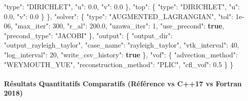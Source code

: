 \documentclass[
  10pt,
]{article}
\newenvironment{Shaded}{}{}
\newcommand{\DataTypeTok}[1]{\textcolor[rgb]{0.56,0.13,0.00}{#1}}
\newcommand{\DecValTok}[1]{\textcolor[rgb]{0.25,0.63,0.44}{#1}}
\newcommand{\FloatTok}[1]{\textcolor[rgb]{0.25,0.63,0.44}{#1}}
\newcommand{\FunctionTok}[1]{\textcolor[rgb]{0.02,0.16,0.49}{#1}}
\newcommand{\KeywordTok}[1]{\textcolor[rgb]{0.00,0.44,0.13}{\textbf{#1}}}
\newcommand{\StringTok}[1]{\textcolor[rgb]{0.25,0.44,0.63}{#1}}
\begin{document}
\begin{Shaded}
\begin{Highlighting}[]
      \DataTypeTok{"type"}\FunctionTok{:} \StringTok{"DIRICHLET"}\FunctionTok{,}
      \DataTypeTok{"u"}\FunctionTok{:} \FloatTok{0.0}\FunctionTok{,}
      \DataTypeTok{"v"}\FunctionTok{:} \FloatTok{0.0}
    \FunctionTok{\},}
    \DataTypeTok{"top"}\FunctionTok{:} \FunctionTok{\{}
      \DataTypeTok{"type"}\FunctionTok{:} \StringTok{"DIRICHLET"}\FunctionTok{,}
      \DataTypeTok{"u"}\FunctionTok{:} \FloatTok{0.0}\FunctionTok{,}
      \DataTypeTok{"v"}\FunctionTok{:} \FloatTok{0.0}
    \FunctionTok{\}}
  \FunctionTok{\},}
  \DataTypeTok{"solver"}\FunctionTok{:} \FunctionTok{\{}
    \DataTypeTok{"type"}\FunctionTok{:} \StringTok{"AUGMENTED\_LAGRANGIAN"}\FunctionTok{,}
    \DataTypeTok{"tol"}\FunctionTok{:} \DecValTok{1e{-}06}\FunctionTok{,}
    \DataTypeTok{"max\_iter"}\FunctionTok{:} \DecValTok{300}\FunctionTok{,}
    \DataTypeTok{"r\_al"}\FunctionTok{:} \FloatTok{200.0}\FunctionTok{,}
    \DataTypeTok{"uzawa\_iter"}\FunctionTok{:} \DecValTok{1}\FunctionTok{,}
    \DataTypeTok{"use\_precond"}\FunctionTok{:} \KeywordTok{true}\FunctionTok{,}
    \DataTypeTok{"precond\_type"}\FunctionTok{:} \StringTok{"JACOBI"}
  \FunctionTok{\},}
  \DataTypeTok{"output"}\FunctionTok{:} \FunctionTok{\{}
    \DataTypeTok{"output\_dir"}\FunctionTok{:} \StringTok{"output\_rayleigh\_taylor"}\FunctionTok{,}
    \DataTypeTok{"case\_name"}\FunctionTok{:} \StringTok{"rayleigh\_taylor"}\FunctionTok{,}
    \DataTypeTok{"vtk\_interval"}\FunctionTok{:} \DecValTok{40}\FunctionTok{,}
    \DataTypeTok{"log\_interval"}\FunctionTok{:} \DecValTok{20}\FunctionTok{,}
    \DataTypeTok{"write\_csv\_history"}\FunctionTok{:} \KeywordTok{true}
  \FunctionTok{\},}
  \DataTypeTok{"vof"}\FunctionTok{:} \FunctionTok{\{}
    \DataTypeTok{"advection\_method"}\FunctionTok{:} \StringTok{"WEYMOUTH\_YUE"}\FunctionTok{,}
    \DataTypeTok{"reconstruction\_method"}\FunctionTok{:} \StringTok{"PLIC"}\FunctionTok{,}
    \DataTypeTok{"cfl\_vof"}\FunctionTok{:} \FloatTok{0.5}
  \FunctionTok{\}}
\FunctionTok{\}}
\end{Highlighting}
\end{Shaded}

\paragraph{Résultats Quantitatifs Comparatifs (Référence vs C++17 vs
Fortran
2018)}\label{ruxe9sultats-quantitatifs-comparatifs-ruxe9fuxe9rence-vs-c17-vs-fortran-2018-13}
\end{document}
